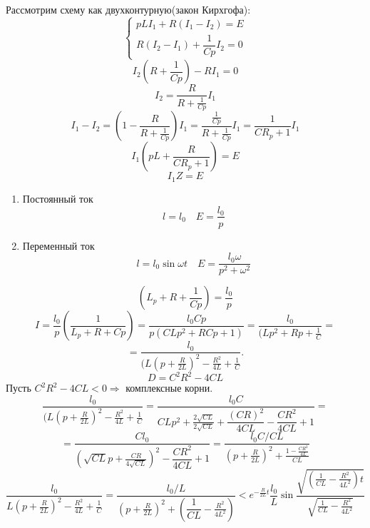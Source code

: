 Рассмотрим схему как двухконтурную(закон Кирхгофа):
\[
	\begin{cases}
		pLI_1 + R(I_1-I_2)=E\\
		R(I_2-I_1) + \dfrac{1}{Cp}I_2 = 0
	\end{cases}
\]
\[
	I_2(R + \dfrac{1}{Cp}) - RI_1 = 0
\]
\[
	I_2 = \dfrac{R}{R+\frac{1}{Cp}}I_1
\]
\[
	I_1- I_2 = \left(1 -   \dfrac{R}{R+\frac{1}{Cp}} \right) I_1 = \dfrac{\frac{1}{Cp}}{R + \frac{1}{Cp}}I_1 = \dfrac{1}{CR_p+1}I_1
\]
\[
	I_1(pL + \dfrac{R}{CR_p+1})=E
\]
\[
	I_1Z=E
\]
\begin{enumerate}
\item Постоянный ток
\[
	l=l_0 \quad E=\dfrac{l_0}{p}
\]
\item Переменный ток
\[
	l = l_0 \sin \omega t \quad E = \dfrac{l_0 \omega}{p^2 + \omega^2}
\]
\end{enumerate}
\[
	(L_p + R + \dfrac{1}{Cp}) = \dfrac{l_0}{p}
\]
\[
	I = \dfrac{l_0}{p}\left( \dfrac{1}{L_p + R + Cp} \right) = \dfrac{l_0 C p}{p(CLp^2 + RCp + 1)} = \dfrac{l_0}{(Lp^2+Rp+\frac{1}{C}}=
\]
\[
	= \dfrac{l_0}{(L(p+\frac{R}{2L})^2-\frac{R^2}{4L} + \frac{1}{C}}.
\]
\[	
	D = C^2R^2 - 4CL
\]
Пусть \( C^2R^2 - 4CL < 0 \Rightarrow \)  комплексные корни.\\
\[
\dfrac{l_0}{(L(p+\frac{R}{2L})^2-\frac{R^2}{4L} + \frac{1}{C}} = \dfrac{l_0C}{CLp^2 + \frac{2\sqrt{CL}}{2\sqrt{CL}}+\dfrac{(CR)^2}{4CL}-\dfrac{CR^2}{4CL} +1} =
\]
\[
	= \dfrac{Cl_0}{(\sqrt{CL}p + \frac{CR}{4\sqrt{CL}})^2 - \dfrac{CR^2}{4CL} +1} = \dfrac{l_0 C/CL}{(p+\frac{R}{2L})^2 +\frac{1-\frac{CR^2}{4L}}{CL}}
\]
\[
	\dfrac{l_0}{L(p+\frac{R}{2L})^2 - \frac{R^2}{4L} + \frac{1}{C}} = \dfrac{l_0/L}{(p+\frac{R}{2L})^2  + (\dfrac{1}{CL}-\frac{R^2}{4L^2})} < e^{-\frac{R}{2L}t}\dfrac{l_0}{L} \sin  \dfrac{\sqrt{(\frac{1}{CL}-\frac{R^2}{4L^2})t}}{\sqrt{\frac{1}{CL}-\frac{R^2}{4L^2}}}
\]